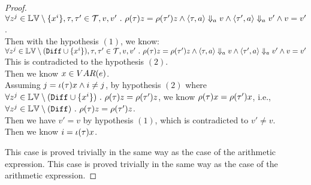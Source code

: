 \begin{proof}
\\
$\forall z^j \in \mathbb{LV} \setminus \{x^i\}, \mathtt{\tau}, \mathtt{\tau}' \in \mathcal{T}, v, v' ~.~  
\rho(\mathtt{\tau}) z = \rho(\mathtt{\tau}') z \land 
\langle \mathtt{\tau}, a \rangle \Downarrow_a v \land \langle \mathtt{\tau}', a \rangle \Downarrow_a v' \land v = v'$.
\\
Then with the hypothesis $(1)$, we know:
\\
$\forall z^j \in \mathbb{LV} \setminus (\mathtt{Diff} \cup \{x^i\} ), \mathtt{\tau}, \mathtt{\tau}' \in \mathcal{T}, v, v' ~.~  
\rho(\mathtt{\tau}) z = \rho(\mathtt{\tau}') z \land 
\langle \mathtt{\tau}, a \rangle \Downarrow_a v \land \langle \mathtt{\tau}', a \rangle \Downarrow_a v' \land v = v'$
\\
This is contradicted to the hypothesis $(2)$.
\\
Then we know $x \in VAR(e)$.
\\
Assuming $j = \iota(\mathtt{\tau}) x \land i \neq j$,
by hypothesis $(2)$ where 
$ \forall z^j \in \mathbb{LV} \setminus (\mathtt{Diff} \cup \{x^i\} )  ~.~ \rho(\mathtt{\tau}) z = \rho(\mathtt{\tau}') z $, 
we know $\rho(\mathtt{\tau}) x = \rho(\mathtt{\tau}') x$, i.e., 
\\
$\forall z^j \in  \mathbb{LV} \setminus (\mathtt{Diff}  ) ~.~  \rho(\mathtt{\tau}) z = \rho(\mathtt{\tau}') z$.
\\
Then we have $v' = v$ by hypothesis $(1)$, which is contradicted to $v' \neq v$.
\\
Then we know $i = \iota(\mathtt{\tau}) x $.

This case is proved trivially in the same way as the case of the arithmetic expression.
This case is proved trivially in the same way as the case of the arithmetic expression.
\end{proof}
